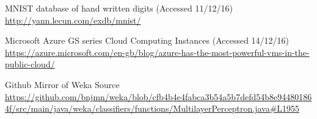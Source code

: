 \documentclass[10pt]{article}
\begin{document}
  \begin{thebibliography}{9}

      MNIST database of hand written digits (Accessed 11/12/16)\\
      \url{http://yann.lecun.com/exdb/mnist/}


      Microsoft Azure GS series Cloud Computing Instances (Accessed 14/12/16)\\
      \url{https://azure.microsoft.com/en-gb/blog/azure-has-the-most-powerful-vms-in-the-public-cloud/}

      Github Mirror of Weka Source
      \url{https://github.com/bnjmn/weka/blob/cfb4b4e4fabca3b54a5b7defd54b8e944801864f/src/main/java/weka/classifiers/functions/MultilayerPerceptron.java#L1955}
  \end{thebibliography}
\end{document}
